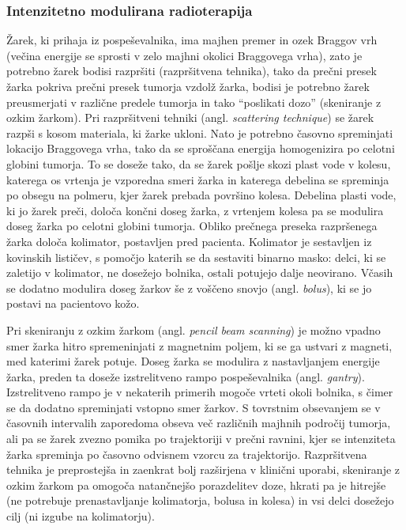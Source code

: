 \documentclass[a4paper,twoside,11pt]{article}
\begin{document}
	\subsubsection*{Intenzitetno modulirana radioterapija}
	\par{
	  Žarek, ki prihaja iz pospeševalnika, ima majhen premer in ozek Braggov vrh (večina energije se sprosti v zelo majhni okolici Braggovega vrha), zato je potrebno žarek bodisi razpršiti (razpršitvena tehnika), tako da prečni presek žarka pokriva prečni presek tumorja vzdolž žarka, bodisi je potrebno žarek preusmerjati v različne predele tumorja in tako ``poslikati dozo'' (skeniranje z ozkim žarkom). Pri razpršitveni tehniki (angl. \emph{scattering technique}) se žarek razpši s kosom materiala, ki žarke ukloni. Nato je potrebno časovno spreminjati lokacijo Braggovega vrha, tako da se sproščana energija homogenizira po celotni globini tumorja. To se doseže tako, da se žarek pošlje skozi plast vode v kolesu, katerega os vrtenja je vzporedna smeri žarka in katerega debelina se spreminja po obsegu na polmeru, kjer žarek prebada površino kolesa. Debelina plasti vode, ki jo žarek preči, določa končni doseg žarka, z vrtenjem kolesa pa se modulira doseg žarka po celotni globini tumorja. Obliko prečnega preseka razpršenega žarka določa kolimator, postavljen pred pacienta. Kolimator je sestavljen iz kovinskih lističev, s pomočjo katerih se da sestaviti binarno masko: delci, ki se zaletijo v kolimator, ne dosežejo bolnika, ostali potujejo dalje neovirano. Včasih se dodatno modulira doseg žarkov še z voščeno snovjo (angl. \emph{bolus}), ki se jo postavi na pacientovo kožo.
	}
	\par{
	  Pri skeniranju z ozkim žarkom (angl. \emph{pencil beam scanning}) je možno vpadno smer žarka hitro spremeninjati z magnetnim poljem, ki se ga ustvari z magneti, med katerimi žarek potuje. Doseg žarka se modulira z nastavljanjem energije žarka, preden ta doseže izstrelitveno rampo pospeševalnika (angl. \emph{gantry}). Izstrelitveno rampo je v nekaterih primerih mogoče vrteti okoli bolnika, s čimer se da dodatno spreminjati vstopno smer žarkov. S tovrstnim obsevanjem se v časovnih intervalih zaporedoma obseva več različnih majhnih področij tumorja, ali pa se žarek zvezno pomika po trajektoriji v prečni ravnini, kjer se intenziteta žarka spreminja po časovno odvisnem vzorcu za trajektorijo. Razpršitvena tehnika je preprostejša in zaenkrat bolj razširjena v klinični uporabi, skeniranje z ozkim žarkom pa omogoča natančnejšo porazdelitev doze, hkrati pa je hitrejše (ne potrebuje prenastavljanje kolimatorja, bolusa in kolesa) in vsi delci dosežejo cilj (ni izgube na kolimatorju). %
	}
	
\end{document}
